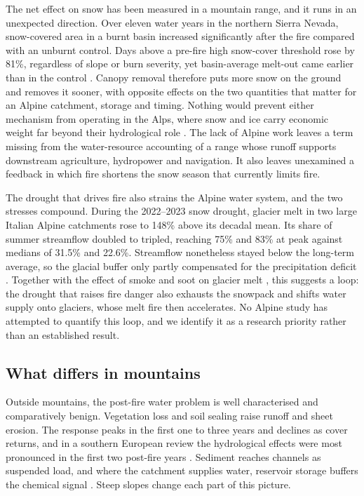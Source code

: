\documentclass[11pt,a4paper]{article}
\begin{document}
The net effect on snow has been measured in a mountain range, and it runs in an unexpected direction. Over eleven water years in the northern Sierra Nevada, snow-covered area in a burnt basin increased significantly after the fire compared with an unburnt control. Days above a pre-fire high snow-cover threshold rose by 81\%, regardless of slope or burn severity, yet basin-average melt-out came earlier than in the control \citep{micheletty_application_2014}. Canopy removal therefore puts more snow on the ground and removes it sooner, with opposite effects on the two quantities that matter for an Alpine catchment, storage and timing. Nothing would prevent either mechanism from operating in the Alps, where snow and ice carry economic weight far beyond their hydrological role \citep{pede_mountain_2022}. The lack of Alpine work leaves a term missing from the water-resource accounting of a range whose runoff supports downstream agriculture, hydropower and navigation. It also leaves unexamined a feedback in which fire shortens the snow season that currently limits fire.

The drought that drives fire also strains the Alpine water system, and the two stresses compound. During the 2022--2023 snow drought, glacier melt in two large Italian Alpine catchments rose to 148\% above its decadal mean. Its share of summer streamflow doubled to tripled, reaching 75\% and 83\% at peak against medians of 31.5\% and 22.6\%. Streamflow nonetheless stayed below the long-term average, so the glacial buffer only partly compensated for the precipitation deficit \citep{leone_20222023_2026}. Together with the effect of smoke and soot on glacier melt \citep{aubrywake_fire_2022}, this suggests a loop: the drought that raises fire danger also exhausts the snowpack and shifts water supply onto glaciers, whose melt fire then accelerates. No Alpine study has attempted to quantify this loop, and we identify it as a research priority rather than an established result.

\subsection{What differs in mountains}

Outside mountains, the post-fire water problem is well characterised and comparatively benign. Vegetation loss and soil sealing raise runoff and sheet erosion. The response peaks in the first one to three years and declines as cover returns, and in a southern European review the hydrological effects were most pronounced in the first two post-fire years \citep{misseyanni_impact_2025}. Sediment reaches channels as suspended load, and where the catchment supplies water, reservoir storage buffers the chemical signal \citep{basso_potential_2021}. Steep slopes change each part of this picture.
\end{document}
